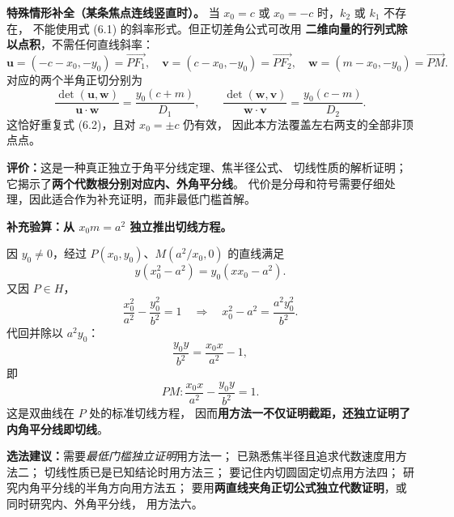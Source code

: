 \begin{proofbox}
\medskip
\textbf{特殊情形补全（某条焦点连线竖直时）。}
当 $x_0=c$ 或 $x_0=-c$ 时，$k_2$ 或 $k_1$ 不存在，
不能使用式 (6.1) 的斜率形式。但正切差角公式可改用
\textbf{二维向量的行列式除以点积}，不需任何直线斜率：
\[
\boldsymbol u=(-c-x_0,-y_0)=\overrightarrow{PF_1},\quad
\boldsymbol v=(c-x_0,-y_0)=\overrightarrow{PF_2},\quad
\boldsymbol w=(m-x_0,-y_0)=\overrightarrow{PM}.
\]
对应的两个半角正切分别为
\[
\frac{\det(\boldsymbol u,\boldsymbol w)}
     {\boldsymbol u\cdot\boldsymbol w}
=\frac{y_0(c+m)}{D_1},\qquad
\frac{\det(\boldsymbol w,\boldsymbol v)}
     {\boldsymbol w\cdot\boldsymbol v}
=\frac{y_0(c-m)}{D_2}.
\]
这恰好重复式 (6.2)，且对 $x_0=\pm c$ 仍有效，
因此本方法覆盖左右两支的全部非顶点点。

\textbf{评价：}这是一种真正独立于角平分线定理、焦半径公式、
切线性质的解析证明；它揭示了\textbf{两个代数根分别对应内、外角平分线}。
代价是分母和符号需要仔细处理，因此适合作为补充证明，而非最低门槛首解。
\end{proofbox}

\clearpage
\begin{proofbox}
\textbf{补充验算：从 $x_0m=a^2$ 独立推出切线方程。}

因 $y_0\ne0$，经过 $P(x_0,y_0)$、$M(a^2/x_0,0)$ 的直线满足
\[
y(x_0^2-a^2)=y_0(xx_0-a^2).
\]
又因 $P\in H$，
\[
\frac{x_0^2}{a^2}-\frac{y_0^2}{b^2}=1
\quad\Longrightarrow\quad
x_0^2-a^2=\frac{a^2y_0^2}{b^2}.
\]
代回并除以 $a^2y_0$：
\[
\frac{y_0y}{b^2}=\frac{x_0x}{a^2}-1,
\]
即
\[
\boxed{PM:\frac{x_0x}{a^2}-\frac{y_0y}{b^2}=1}.
\]
这是双曲线在 $P$ 处的标准切线方程，
因而\textbf{用方法一不仅证明截距，还独立证明了内角平分线即切线}。

\medskip
\textbf{选法建议：}需要\emph{最低门槛独立证明}用方法一；
已熟悉焦半径且追求代数速度用方法二；
切线性质已是已知结论时用方法三；
要记住内切圆固定切点用方法四；
研究内角平分线的半角方向用方法五；
要用\textbf{两直线夹角正切公式独立代数证明}，或同时研究内、外角平分线，
用方法六。
\end{proofbox}

